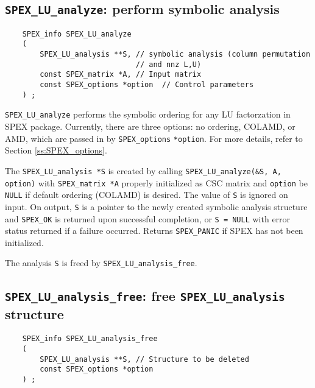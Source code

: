 \documentclass[12pt]{report}
\theoremstyle{definition}
\begin{document}
\cprotect\subsection{\verb|SPEX_LU_analyze|: perform symbolic analysis}
\label{s:SPEX_LU_analyze}

\begin{mdframed}[userdefinedwidth=6in]
{\footnotesize
\begin{verbatim}
    SPEX_info SPEX_LU_analyze
    (
        SPEX_LU_analysis **S, // symbolic analysis (column permutation
                              // and nnz L,U)
        const SPEX_matrix *A, // Input matrix
        const SPEX_options *option  // Control parameters
    ) ;
\end{verbatim}
} \end{mdframed}

\verb|SPEX_LU_analyze| performs the symbolic ordering for any LU factorzation in SPEX package. Currently,
there are three options: no ordering, COLAMD, or AMD, which are passed in by
\verb|SPEX_options| \verb|*option|. For more details, refer to
Section \ref{ss:SPEX_options}.

The \verb|SPEX_LU_analysis *S| is created by calling
\verb|SPEX_LU_analyze(&S, A, option)| with \verb|SPEX_matrix *A| properly
initialized as CSC matrix and \verb|option| be \verb|NULL| if default ordering
(COLAMD) is desired. The value of \verb|S| is ignored on input.  On output,
\verb|S| is a pointer to the newly created symbolic analysis structure and
\verb|SPEX_OK| is returned upon successful completion, or \verb|S = NULL| with
error status returned if a failure occurred.  Returns \verb|SPEX_PANIC| if SPEX
has not been initialized.

The analysis \verb|S| is freed by \verb|SPEX_LU_analysis_free|.

\newpage
\cprotect\subsection{\verb|SPEX_LU_analysis_free|: free \verb|SPEX_LU_analysis| structure}
\label{ss:LU_analysis_free}

\begin{mdframed}[userdefinedwidth=6in]
{\footnotesize
\begin{verbatim}
    SPEX_info SPEX_LU_analysis_free
    (
        SPEX_LU_analysis **S, // Structure to be deleted
        const SPEX_options *option
    ) ;
\end{verbatim}
} \end{mdframed}
\end{document}

